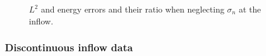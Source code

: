 \documentclass[11pt,onecolumn]{scrartcl}
\begin{document}
\begin{figure}[h!]
\centering
{}
\caption{$L^2$ and energy errors and their ratio when neglecting $\sigma_n$ at the inflow.}
\label{ratios_noSigma}
\end{figure}

\subsubsection{Discontinuous inflow data}
\end{document}
